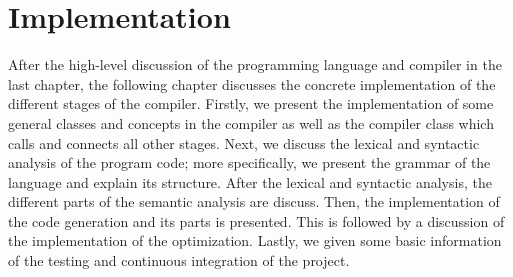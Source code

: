 \chapter{Implementation}
\label{ch:implementation}
After the high-level discussion of the programming language and compiler in the last chapter, the following chapter discusses the concrete implementation of the different stages of the compiler. Firstly, we present the implementation of some general classes and concepts in the compiler as well as the compiler class which calls and connects all other stages. Next, we discuss the lexical and syntactic analysis of the program code; more specifically, we present the grammar of the language and explain its structure. After the lexical and syntactic analysis, the different parts of the semantic analysis are discuss. Then, the implementation of the code generation and its parts is presented. This is followed by a discussion of the implementation of the optimization. Lastly, we given some basic information of the testing and continuous integration of the project. 












% 